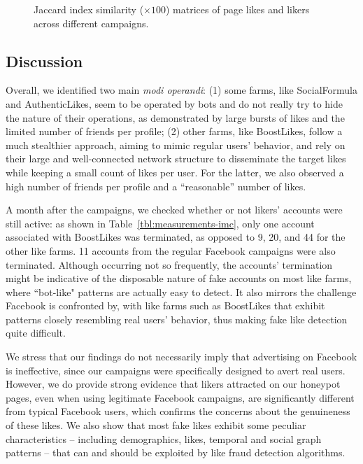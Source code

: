 \documentclass[twocolumn,10pt,letterpaper]{article}
\begin{document}
\begin{figure*}[t!]
%
\centering
\vspace{-0.15cm}
\caption{Jaccard index similarity ($\times 100$) matrices of page likes and likers across different campaigns.}
\label{fig:similarity-matrix}
%
\end{figure*}

\subsection{Discussion}
Overall, we identified two main {\em modi operandi}: (1) some farms, like SocialFormula and AuthenticLikes, seem to be operated by bots and do not really try to hide the nature of their operations, as demonstrated by large bursts of likes and the limited number of friends per profile; (2) other farms, like BoostLikes, follow a much stealthier approach, aiming to mimic regular users' behavior, and rely on their large and well-connected network structure to disseminate the target likes while keeping a small count of likes per user. For the latter, we also observed a high number of friends per profile and a ``reasonable'' number of likes.

%
A month after the campaigns, we checked whether or not likers' accounts were still active:
as shown in Table~\ref{tbl:measurements-imc}, only one account associated with BoostLikes was terminated, as opposed to 9, 20, and 44 for the other like farms. 11 accounts from the regular Facebook campaigns were also terminated.
Although occurring not so frequently, the accounts' termination might be indicative of the disposable nature of fake accounts on most like farms, where ``bot-like" patterns are actually easy to detect.
It also mirrors the challenge Facebook is confronted by, with like farms such as BoostLikes that exhibit patterns closely resembling real users' behavior, thus making fake like detection quite difficult.

We stress that our findings do not necessarily imply that advertising on Facebook is ineffective, since our campaigns were specifically designed to avert real users. However, we do provide strong evidence that likers attracted on our honeypot pages, even when using legitimate Facebook campaigns, are significantly different from typical Facebook users, which confirms the concerns about the genuineness of these likes.
%
We also show that most fake likes exhibit some peculiar characteristics -- including demographics, likes, temporal and social graph patterns -- that can and should be exploited by like fraud detection algorithms.
\end{document}

